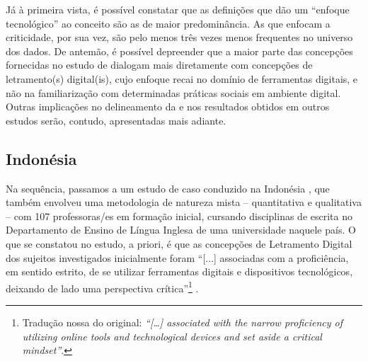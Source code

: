 \documentclass[portuguese]{textolivre}
\begin{document}

Já à primeira vista, é possível constatar que as definições que dão um “enfoque tecnológico” ao conceito são as de maior predominância. As que enfocam a criticidade, por sua vez, são pelo menos três vezes menos frequentes no universo dos dados. De antemão, é possível depreender que a maior parte das concepções fornecidas no estudo de \textcite{list_framework_2020} dialogam mais diretamente com concepções de letramento(s) digital(is), cujo enfoque recai no domínio de ferramentas digitais, e não na familiarização com determinadas práticas sociais em ambiente digital. Outras implicações no delineamento da  e nos resultados obtidos em outros estudos serão, contudo, apresentadas mais adiante.

\subsection{Indonésia \cite{nabhan_pre-service_2021}}

Na sequência, passamos a um estudo de caso conduzido na Indonésia \cite{nabhan_pre-service_2021}, que também envolveu uma metodologia de natureza mista – quantitativa e qualitativa – com 107 professoras/es em formação inicial, cursando disciplinas de escrita no Departamento de Ensino de Língua Inglesa de uma universidade naquele país. O que se constatou no estudo, a priori, é que as concepções de Letramento Digital dos sujeitos investigados inicialmente foram “[...] associadas com a proficiência, em sentido estrito, de se utilizar ferramentas digitais e dispositivos tecnológicos, deixando de lado uma perspectiva crítica”\footnote{Tradução nossa do original: \textit{“[…] associated with the narrow proficiency of utilizing online tools and technological devices and set aside a critical mindset”}.} \cite[p.~187]{nabhan_pre-service_2021}.
\end{document}
